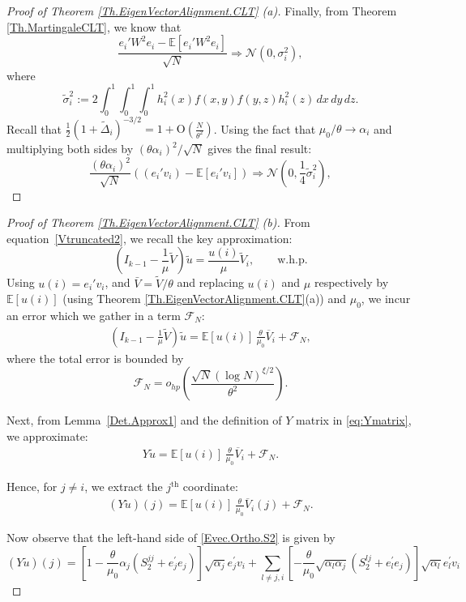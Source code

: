 \documentclass[11pt, reqno]{amsart}
\numberwithin{equation}{section}
\newcommand{\E}{\mbox{${\mathbb E}$}}
\begin{document}
\begin{proof}[Proof of Theorem \ref{Th.EigenVectorAlignment.CLT} (a)]
Finally, from Theorem \ref{Th.MartingaleCLT}, we know that
\[
\frac{e_i' W^2 e_i - \mathbb{E}[e_i' W^2 e_i]}{\sqrt{N}} \Rightarrow \mathcal{N}(0, \sigma_i^2),
\]
where
\[
\tilde\sigma_i^2 := 2 \int_0^1 \int_0^1 \int_0^1 h_i^2(x) f(x,y) f(y,z) h_i^2(z) \, dx\,dy\,dz.
\]
Recall that $\frac{1}{2} (1 + \tilde\Delta_i)^{-3/2}= 1+ \mathrm{O}(\frac{N}{\theta^2})$. Using the fact that $\mu_0/\theta\to\alpha_i$ and multiplying both sides by $(\theta \alpha_i)^2/\sqrt{N}$ gives the final result:
\[
\frac{(\theta \alpha_i)^2}{\sqrt{N}} \left( (e_i' v_i) - \mathbb{E}[e_i' v_i] \right) \Rightarrow \mathcal{N}(0, \frac{1}{4}\tilde\sigma_i^2),
\]

\end{proof}



\begin{proof}[Proof of Theorem \ref{Th.EigenVectorAlignment.CLT} (b)]
From equation~\eqref{Vtruncated2}, we recall the key approximation:
\begin{equation}\label{Vtruncated3}
\left(I_{k-1} - \frac{1}{\mu} \widetilde{V} \right)\widetilde{u} = \frac{u(i)}{\mu} \widetilde{V}_i, \qquad \text{w.h.p.}
\end{equation}
Using $u(i)= e_i' v_i$, and $\bar{V}=\tilde{V}/\theta$ and replacing $u(i)$ and $\mu$ respectively by $\E[u(i)]$ (using Theorem \ref{Th.EigenVectorAlignment.CLT}(a))  and $\mu_0$, we incur an error which we gather in a term $\mathcal F_N$:
\begin{align}
\label{Evec.Ortho.S1}
\left(I_{k-1} - \frac{1}{\mu} \widetilde{V} \right)\widetilde{u}
= \mathbb{E}[u(i)]\,\frac{\theta}{\mu_0} \overline{V}_i + \mathcal{F}_N,
\end{align}
where the total error is bounded by
\[
\mathcal{F}_N = o_{hp} \left( \frac{\sqrt{N}(\log N)^{\xi/2}}{\theta^2} \right).
\]

Next, from Lemma~\ref{Det.Approx1} and the definition of $Y$ matrix in \eqref{eq:Ymatrix}, we approximate:
\begin{align}
Y \widetilde{u}
= \mathbb{E}[u(i)]\,\frac{\theta}{\mu_0} \overline{V}_i + \mathcal{F}_N.
\end{align}

Hence, for \(j \neq i\), we extract the \(j^{\text{th}}\) coordinate:
\begin{align}
\label{Evec.Ortho.S2}
(Y\widetilde{u})(j) = \mathbb{E}[u(i)]\,\frac{\theta}{\mu_0} \overline{V}_i(j) + \mathcal{F}_N.
\end{align}

Now observe that the left-hand side of \eqref{Evec.Ortho.S2} is given by
\[
(Y\widetilde{u})(j) = \left[1 - \frac{\theta}{\mu_0}\alpha_j\left(S_2^{jj}+e_j^\prime e_j\right)\right]\sqrt{\alpha_j}e_j^\prime v_i + \sum_{l \ne j,i}\left[- \frac{\theta}{\mu_0}\sqrt{\alpha_l\alpha_j}(S_2^{lj} + e_l^\prime e_j)\right]\sqrt{\alpha_l}e_l^\prime v_i
\]


\end{proof}
\end{document}
